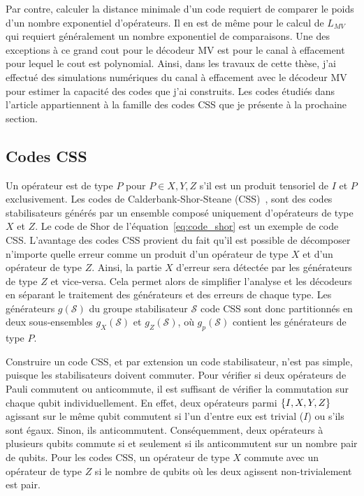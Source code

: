 Par contre,
calculer la distance minimale d'un code requiert de comparer le poids d'un nombre exponentiel d'opérateurs.
Il en est de même pour le calcul de $L_{MV}$ qui requiert généralement un nombre exponentiel de comparaisons.
Une des exceptions à ce grand cout pour le décodeur MV est pour le canal à effacement pour lequel
le cout est  polynomial.
Ainsi, dans les travaux de cette thèse,
j'ai effectué des simulations numériques du canal à effacement avec le décodeur MV pour estimer la
capacité des codes que j'ai construits.
Les codes étudiés dans l'article appartiennent 
à la famille des codes CSS que je présente à la prochaine section.

\subsection{Codes CSS}

Un opérateur est de type $P$ pour $P \in {X, Y, Z}$ s'il est un produit tensoriel de $I$ et $P$ exclusivement.
Les codes de Calderbank-Shor-Steane (CSS)~\cite{calderbank_good_1996, steane_multiple-particle_nodate},
sont des codes stabilisateurs générés par un ensemble composé uniquement d'opérateurs de type $X$ et $Z$.
Le code de Shor de l'équation~\ref{eq:code_shor} est un exemple de code CSS.
L'avantage des codes CSS provient du fait qu'il est possible de décomposer n'importe quelle erreur
comme un produit d'un opérateur de type $X$ et d'un opérateur de type $Z$.
Ainsi,
la partie $X$ d'erreur sera détectée par les générateurs de type $Z$ et vice-versa.
Cela permet alors de simplifier l'analyse et les décodeurs en séparant le traitement des générateurs 
et des erreurs de chaque type.
Les générateurs $g(\mathcal S)$ du groupe stabilisateur $\mathcal S$
code CSS sont donc partitionnés en deux sous-ensembles $g_X(\mathcal S)$ et $g_Z(\mathcal S)$,
où $g_p(\mathcal S)$ contient les générateurs de type $P$.

Construire un code CSS, et par extension un code stabilisateur, n'est pas simple,
puisque les stabilisateurs doivent commuter.
Pour vérifier si deux opérateurs de Pauli commutent ou anticommute,
il est suffisant de vérifier la commutation sur chaque qubit individuellement.
En effet,
deux opérateurs parmi $\qty{I, X, Y, Z}$ agissant sur le même qubit commutent si l'un d'entre 
eux est trivial ($I$) ou s'ils sont égaux.
Sinon, ils anticommutent.
Conséquemment,
deux opérateurs à plusieurs qubits commute si et seulement si ils anticommutent sur un nombre 
pair de qubits.
Pour les codes CSS, 
un opérateur de type $X$ commute avec un opérateur de type $Z$ si le nombre de qubits où les deux
agissent non-trivialement est pair.

